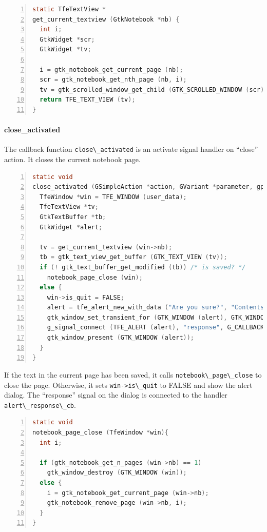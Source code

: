 \begin{lstlisting}[language=C, numbers=left]
static TfeTextView *
get_current_textview (GtkNotebook *nb) {
  int i;
  GtkWidget *scr;
  GtkWidget *tv;

  i = gtk_notebook_get_current_page (nb);
  scr = gtk_notebook_get_nth_page (nb, i);
  tv = gtk_scrolled_window_get_child (GTK_SCROLLED_WINDOW (scr));
  return TFE_TEXT_VIEW (tv);
}
\end{lstlisting}

\paragraph{close\_activated}\label{close_activated}

The callback function \passthrough{\lstinline!close\_activated!} is an
activate signal handler on ``close'' action. It closes the current
notebook page.

\begin{lstlisting}[language=C, numbers=left]
static void
close_activated (GSimpleAction *action, GVariant *parameter, gpointer user_data) {
  TfeWindow *win = TFE_WINDOW (user_data);
  TfeTextView *tv;
  GtkTextBuffer *tb;
  GtkWidget *alert;

  tv = get_current_textview (win->nb);
  tb = gtk_text_view_get_buffer (GTK_TEXT_VIEW (tv));
  if (! gtk_text_buffer_get_modified (tb)) /* is saved? */
    notebook_page_close (win);
  else {
    win->is_quit = FALSE;
    alert = tfe_alert_new_with_data ("Are you sure?", "Contents aren't saved yet.\nAre you sure to close?", "Close");
    gtk_window_set_transient_for (GTK_WINDOW (alert), GTK_WINDOW (win));
    g_signal_connect (TFE_ALERT (alert), "response", G_CALLBACK (alert_response_cb), win);
    gtk_window_present (GTK_WINDOW (alert));
  }
}
\end{lstlisting}

If the text in the current page has been saved, it calls
\passthrough{\lstinline!notebook\_page\_close!} to close the page.
Otherwise, it sets \passthrough{\lstinline!win->is\_quit!} to FALSE and
show the alert dialog. The ``response'' signal on the dialog is
connected to the handler \passthrough{\lstinline!alert\_response\_cb!}.

\begin{lstlisting}[language=C, numbers=left]
static void
notebook_page_close (TfeWindow *win){
  int i;

  if (gtk_notebook_get_n_pages (win->nb) == 1)
    gtk_window_destroy (GTK_WINDOW (win));
  else {
    i = gtk_notebook_get_current_page (win->nb);
    gtk_notebook_remove_page (win->nb, i);
  }
}
\end{lstlisting}

